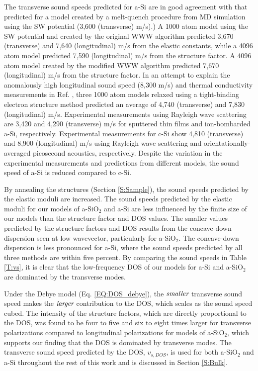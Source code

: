 \documentclass[aps,prb,twocolumn,superscriptaddress,footinbib,amsmath,amssymb,floatfix]{revtex4}
\begin{document}
The transverse sound speeds predicted for 
a-Si are in good agreement with that predicted for a model 
created by a melt-quench procedure from MD simulation using 
the SW potential (3,600 (transverse) m/s).\cite{kluge_elastic_1988}) 
A 1000 atom model using the SW potential and created by the 
original WWW algorithm predicted 3,670 (transverse) 
and 7,640 (longitudinal) m/s from 
the elastic constants,\cite{feldman_elastic_1991} 
while a 4096 atom model predicted 7,590 (longitudinal) m/s 
from the structure factor.\cite{feldman_calculations_2002} 
A 4096 atom model created by the modified WWW algorithm
\cite{barkema_high-quality_2000} predicted 
7,670 (longitudinal) m/s from the structure factor.
\cite{christie_vibrational_2007} In an attempt to explain the  
anomalously high longitudinal sound speed (8,300 m/s) and  
thermal conductivity measurements in Ref. , 
three 1000 atom models relaxed using a tight-binding electron 
structure method predicted an average of 4,740 (transverse) and 
7,830 (longitudinal) m/s.\cite{liu_high_2009} Experimental 
measurements using Rayleigh wave scattering 
are 3,420 and 4,290 (transverse) m/s for sputtered thin films 
and ion-bombarded a-Si, respectively.\cite{vacher_attenuation_1980}
Experimental measurements for c-Si show 4,810 (transverse) and 
8,900 (longitudinal) m/s using Rayleigh wave scattering
\cite{vacher_attenuation_1980}
and orientationally-averaged picosecond 
acoustics, respectively.\cite{yang_anomalously_2010} 
Despite the variation in the experimental measurements and predictions 
from different models, the sound speed of a-Si is reduced 
compared to c-Si.

By annealing the structures (Section \ref{S:Sample}), 
the sound speeds predicted by the elastic moduli are increased. 
The sound speeds predicted by the elastic moduli 
for our models of a-SiO$_2$ and a-Si are less influenced 
by the finite size of our models than the structure factor and DOS 
values.    
The smaller values predicted by the structure factors and DOS 
results from the concave-down dispersion seen at low 
wavevector, particularly for a-SiO$_2$. The concave-down dispersion 
is less pronounced for a-Si, where the sound speeds predicted 
by all three methods are within five percent. 
By comparing the sound speeds in Table \ref{T:vs}, it is clear that 
the low-frequency DOS of our models for a-Si and a-SiO$_2$ are 
dominated by the 
transverse modes.  

Under the Debye model (Eq. \eqref{EQ:DOS_debye}), 
the $\emph{smaller}$ transverse sound speed 
makes the $\emph{larger}$ contribution to the DOS, which scales 
as the sound speed cubed. 
The intensity of the structure factors, which   
are directly proportional to the DOS,
\cite{beltukov_ioffe-regel_2013} was found 
to be four to five\cite{taraskin_phonons_1997} 
and six to eight\cite{horbach_high_2001} times larger for 
transverse polarizations compared to longitudinal polarizations 
for models of a-SiO$_2$, 
which supports our finding that the DOS is dominated 
by transverse modes. 
The transverse sound speed predicted by the DOS, $v_{s,DOS}$, is used 
for both 
a-SiO$_2$ and a-Si throughout the rest of this work and is discussed 
in Section \ref{S:Bulk}.
\end{document}
